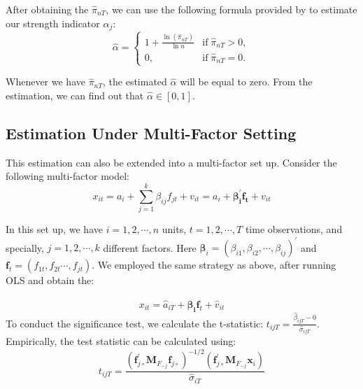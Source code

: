 After obtaining the $\hat{\pi}_{nT}$, we can use the following formula provided by  to estimate our strength indicator $\alpha_j$:
\[ \hat{\alpha} = \begin{cases}
1+\frac{\ln(\hat{\pi}_{nT})}{\ln n} & \text{if}\; \hat{\pi}_{nT} > 0,\\
0, & \text{if}\; \hat{\pi}_{nT} = 0.
	\end{cases} \tag{6} \label{estimation_method} \]

Whenever we have $\hat{\pi}_{nT}$, the estimated $\hat{\alpha}$ will be equal to zero. 
From the estimation, we can find out that $\hat{\alpha} \in [0,1]$.

	\subsection{Estimation Under Multi-Factor Setting}\label{strength_multi_estimation}

This estimation can also be extended into a multi-factor set up.
Consider the following multi-factor model:
\[x_{it} = a_i +\sum_{j = 1}^k\beta_{ij}f_{jt} +v_{it} = a_i + \mathbf{\beta^{\prime}_{i}f_{t}} +v_{it} \]

In this set up, we have $i = 1, 2, \cdots, n$ units, $t = 1, 2, \cdots, T$ time observations, and specially, $j = 1, 2,\cdots, k$ different factors.
Here $\mathbf{\beta}_{i} = (\beta_{i1}, \beta_{i2}, \cdots, \beta_{ij})^{\prime} $ and $\mathbf{f}_t = (f_{1t}, f_{2t}\cdots, f_{jt})$.
We employed the same strategy as above, after running OLS and obtain the:

\[ x_{it} =\hat{a}_{iT} + \mathbf{\hat{\beta}_{i}}\mathbf{f}_{t} + \hat{v}_{it}    \]
To conduct the significance test, we calculate the t-statistic: $t_{ijT} = \frac{\hat{\beta}_{ijT}-0}{\hat{\sigma}_{ijT}}$. Empirically, the test statistic can be calculated using:
\[ t_{i j T}=\frac{\left(\mathbf{f}_{j \circ}^{\prime} \mathbf{M}_{F_{-j}} \mathbf{f}_{j \circ}\right)^{-1 / 2}\left(\mathbf{f}_{j \circ}^{\prime} \mathbf{M}_{F_{-j}} \mathbf{x}_{i}\right)}{\hat{\sigma}_{i T}} \]


